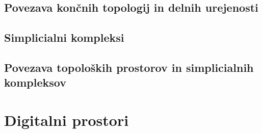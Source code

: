 \documentclass{beamer}
\begin{document}
\subsection{Povezava končnih topologij in delnih urejenosti}
\subsection{Simplicialni kompleksi}
\subsection{Povezava topoloških prostorov in simplicialnih kompleksov}

\section{Digitalni prostori}
\end{document}
